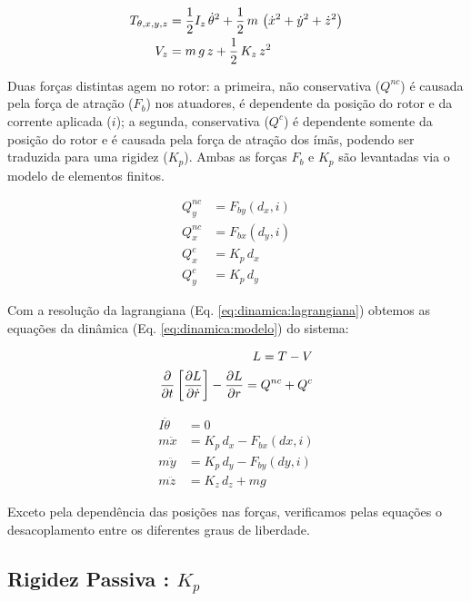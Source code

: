  \begin{align}
 	T_{\theta, x, y, z} &= \frac{1}{2} I_z \, \dot{\theta}^2 + \frac{1}{2} \, m \, \left( \dot{x}^2 + \dot{y}^2 + \dot{z}^2 \right) \notag \\
 	V_z &= m \, g \, z + \frac{1}{2} \, K_z \, z^2
 \end{align}	
 	
 Duas forças distintas agem no rotor: a primeira, não conservativa ($Q^{nc}$) é causada pela força de atração ($F_b$) nos atuadores, é dependente da posição do rotor e da corrente aplicada ($i$); a segunda, conservativa ($Q^{c}$) é dependente somente da posição do rotor e é causada pela força de atração dos ímãs, podendo ser traduzida para uma rigidez ($K_p$). Ambas as forças $F_b$ e $K_p$ são levantadas via o modelo de elementos finitos. 
	 	
 \begin{align}
 	Q_y^{nc} &= F_{by}(d_x,i)  \\
 	Q_x^{nc} &= F_{bx}(d_y,i)  \\
 	Q^{c}_x  &= K_p \, d_x \\
 	Q^{c}_y  &= K_p \, d_y 
 \end{align}
  
  Com a resolução da lagrangiana (Eq. \ref{eq:dinamica:lagrangiana}) obtemos as equações da dinâmica (Eq. \ref{eq:dinamica:modelo}) do sistema:
  
   \begin{align}
   		L = T - V \notag \\
   		\frac{\partial}{\partial t} \left[ \frac{\partial L}{\partial \dot{r}} \right] -  \frac{\partial L}{\partial r} = Q^{nc} + Q^{c}
   		\label{eq:dinamica:lagrangiana}
   \end{align}
  
 	\begin{align}
 	I \ddot{\theta} &= 0 \\
 	m \ddot{x}		&= K_p \, d_x  - F_{bx}(dx,i) \\
 	m \ddot{y}		&= K_p \, d_y  - F_{by}(dy,i) \label{eq:dinamica:rotor:radial}\\	
 	m \ddot{z}  	&= K_z \, d_z + m g 
 	\label{eq:dinamica:modelo}
 	\end{align}	
 
 Exceto pela dependência das posições nas forças, verificamos pelas equações o desacoplamento entre os diferentes graus de liberdade. 

\subsection{Rigidez Passiva : $K_p$}

